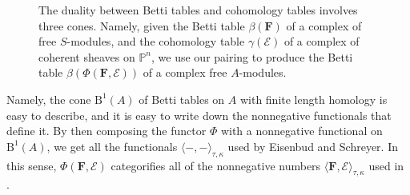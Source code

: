 \documentclass[12pt]{amsart}
\theoremstyle{definition}
\theoremstyle{remark}
\newcommand{\PP}{\mathbb{P}}
\newcommand{\cE}{\mathcal{E}}
\newcommand{\FF}{\mathbf{F}}
\newcommand{\CQ}{\mathrm{C}}
\newcommand{\BBQ}{\mathrm{B}}
\begin{document}
\begin{figure}
\caption{The duality between Betti tables and cohomology tables involves three cones.  Namely, given the Betti table $\beta(\FF)$ of a complex of free $S$-modules, and the cohomology table $\gamma(\cE)$ of a complex of coherent sheaves on $\PP^n$, we use our pairing to produce the Betti table $\beta(\Phi(\FF,\cE))$ of a complex free $A$-modules. 
}
\label{fig:bracket}
\end{figure}


Namely, the cone $\BBQ^{1}(A)$ of Betti tables on $A$ with finite length homology is easy to describe, and it is easy to write down the nonnegative functionals that define it.
By then composing the functor $\Phi$ with a nonnegative functional on $\BBQ^1(A)$, we get all the functionals $\langle -,-\rangle_{\tau,\kappa}$ used by Eisenbud and Schreyer.  In this sense, $\Phi(\FF,\cE)$ categorifies all of the nonnegative numbers $\langle \FF, \cE\rangle_{\tau,\kappa}$ used in \cite{eis-schrey1}.
\end{document}
